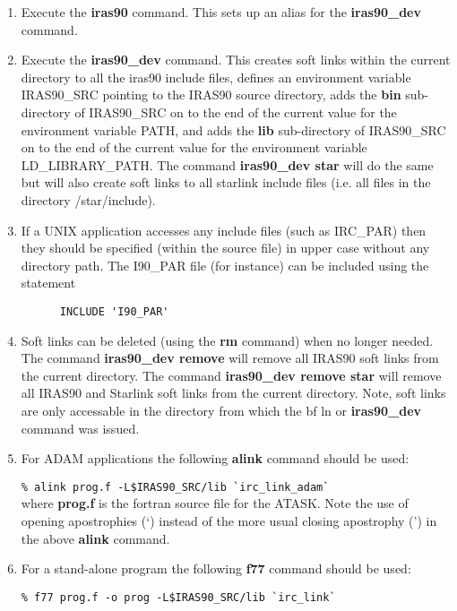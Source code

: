 \begin{enumerate}
\item Execute the {\bf iras90} command. This sets up an alias for the 
{\bf iras90\_dev} command.

\item Execute the {\bf iras90\_dev} command.  This creates soft links
within the current directory to
all the iras90 include files, defines an environment variable IRAS90\_SRC
pointing to the IRAS90 source directory, adds the {\bf bin}
sub-directory of IRAS90\_SRC on to the end of the current value for the
environment variable PATH, and adds the {\bf lib} sub-directory of 
IRAS90\_SRC on to the end of the current value for the environment 
variable LD\_LIBRARY\_PATH. The command {\bf iras90\_dev star} will do
the same but will also create soft links to all starlink include files
(i.e. all files in the directory /star/include).

\item If a UNIX application accesses any include files (such as
IRC\_PAR) then they should be specified (within the source file) in upper case 
without any directory
path. The I90\_PAR file (for instance) can be included using the statement

\verb+      INCLUDE 'I90_PAR'+\\

\item Soft links can be deleted (using the {\bf rm} command) when no longer 
needed.
The command {\bf iras90\_dev remove} will remove all IRAS90 soft links from
the current directory. The command {\bf iras90\_dev remove star} will
remove all IRAS90 and Starlink soft links from the current directory.
Note, soft links are only accessable in the directory from which the {bf ln} 
or {\bf iras90\_dev} command was issued. 
\item For ADAM applications the following {\bf alink} command should be used:

\verb+% alink prog.f -L$IRAS90_SRC/lib `irc_link_adam`+\\

where {\bf prog.f} is the fortran source file for the ATASK.
Note the use of opening apostrophies (`) instead of the more usual closing
apostrophy (') in the above {\bf alink} command.

\item For a stand-alone program the following {\bf f77} command should be used:

\verb+% f77 prog.f -o prog -L$IRAS90_SRC/lib `irc_link`+\\
\end{enumerate}


